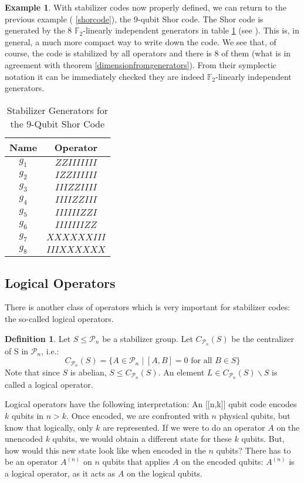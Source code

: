 \documentclass{article}
\def\P{\mathcal{P}}
\def\F{\mathbb{F}}
\theoremstyle{definition}
\newtheorem{ex}[Satz]{Example}
\newtheorem{defn}[Satz]{Definition}
\begin{document}
\begin{ex}
With stabilizer codes now properly defined, we can return to the previous example ( \ref{shorcode}), the 9-qubit Shor code. The Shor code is generated by the 8 $\F_2$-linearly independent generators in table  \ref{shorgenerators} (see \cite{NC}). This is, in general, a much more compact way to write down the code. We see that, of course, the code is stabilized by all operators and there is 8 of them (what is in agreement with theorem  \ref{dimensionfromgenerators}). From their symplectic notation it can be immediately checked they are indeed $\F_2$-linearly independent generators.
\begin{table}[h]
\centering 
\begin{tabular}{|c|c|}
\hline
Name & Operator \\ \hline
$g_1$ & $ZZIIIIIII$ \\ \hline
$g_2$ & $IZZIIIIII$ \\ \hline
$g_3$ & $IIIZZIIII$ \\ \hline
$g_4$ & $IIIIZZIII$ \\ \hline
$g_5$ & $IIIIIIZZI$ \\ \hline
$g_6$ & $IIIIIIIZZ$ \\ \hline
$g_7$ & $XXXXXXIII$ \\ \hline
$g_8$ & $IIIXXXXXX$ \\ \hline
\end{tabular}
\caption{ Stabilizer Generators for the 9-Qubit Shor Code}
\label{shorgenerators}
\end{table}
\end{ex}

\subsection{Logical Operators}
There is another class of operators which is very important for stabilizer codes: the so-called logical operators. 

\begin{defn}
Let $S \leq \P_n$ be a stabilizer group. Let $C_{\P_n}(S)$ be the centralizer of S in $\P_n$,  i.e.:
\[ C_{\P_n}(S) = \{ A \in \P_n \mid [A,B] = 0 \text{ for all } B \in S \} \]
Note that since $S$ is abelian, $S \leq C_{\P_n}(S)$. An element $L \in C_{\P_n}(S) \backslash S$ is called a logical operator.
\end{defn}

Logical operators have the following interpretation:
An [[n,k]] qubit code encodes $k$ qubits in $n > k$. Once encoded, we are confronted with $n$ physical qubits, but know that logically, only $k$ are represented. If we were to do an operator $A$ on the unencoded $k$ qubits, 
we would obtain a different state for these $k$ qubits. But, how would this new state look like when encoded in the $n$ qubits? There has to be an operator $A^{(n)}$ on $n$ qubits that applies $A$ on the encoded qubits: $A^{(n)}$ is a logical
operator, as it acts as $A$ on the logical qubits.
\end{document}
